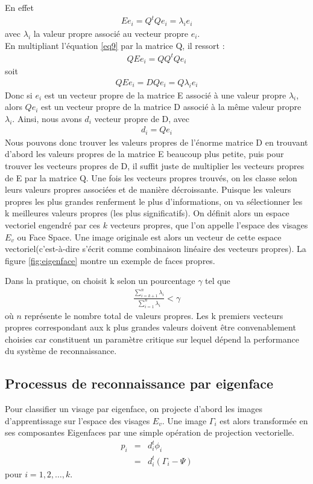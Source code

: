 En effet 
\begin{eqnarray}
Ee_i=Q^tQe_i=\lambda_ie_i
\label{eq9}
\end{eqnarray}
avec $\lambda_i$ la valeur propre associé au vecteur propre $e_i$.\\
En multipliant l'équation \ref{eq9} par la matrice Q, il ressort :
\begin{eqnarray}
QEe_i=QQ^tQe_i
\label{eq10}
\end{eqnarray}
soit \begin{eqnarray*}
QEe_i=DQe_i=Q\lambda_ie_i
\label{eq11}
\end{eqnarray*}
Donc si $e_i$ est un vecteur propre de la matrice E associé à une valeur propre $\lambda_i$, alors $Qe_i$ est un vecteur propre de la matrice D associé à la même valeur propre $\lambda_i$. Ainsi, nous avons $d_i$ vecteur propre de D, avec \begin{eqnarray}
d_i = Qe_i
\label{eq12}
\end{eqnarray}
Nous pouvons donc trouver les valeurs propres de l'énorme matrice D en trouvant 
d'abord les valeurs propres de la matrice E beaucoup plus petite, puis pour trouver les vecteurs propres de D, il suffit juste de multiplier les vecteurs propres de E par la matrice Q. Une fois les vecteurs propres trouvés, on les classe selon leurs valeurs propres associées et de manière décroissante. Puisque les valeurs propres les plus grandes renferment le plus d'informations, on va sélectionner les k meilleures valeurs propres (les plus significatifs). On définit alors un espace vectoriel engendré par ces $k$ vecteurs propres, que 
l'on appelle l'espace des visages $E_v$ ou \og Face Space\fg{}. Une image originale est alors un vecteur de cette espace vectoriel(c'est-à-dire s'écrit comme combinaison linéaire des vecteurs propres). La figure \ref{fig:eigenface} montre un exemple de faces propres.

Dans la pratique, on choisit k selon un pourcentage $\gamma$ tel que
\begin{eqnarray}
\frac{\sum_{i=k+1}^{n}\lambda_i}{\sum_{i=1}^{n}\lambda_i} < \gamma
\label{eq13}
\end{eqnarray}
où $n$ représente le nombre total de valeurs propres.
Les \og k \fg{} premiers vecteurs propres correspondant aux \og k \fg{} plus grandes valeurs doivent être convenablement choisies car constituent un paramètre  critique  sur  lequel  dépend  la  performance  du  système  de reconnaissance. 
\subsection{Processus de reconnaissance par eigenface}
Pour classifier un visage par eigenface, on projecte d'abord les images d'apprentissage sur l'espace des visages $E_v$. Une image $\Gamma_i$ est alors transformée en ses \og composantes Eigenfaces\fg{} par une simple opération de projection vectorielle.
 \begin{eqnarray}
p_i&=&d_i^t\phi_i\\
   &=&d_i^t(\Gamma_i -\Psi)
\label{eq14}
\end{eqnarray}pour $i=1,2, \ldots, k$.

